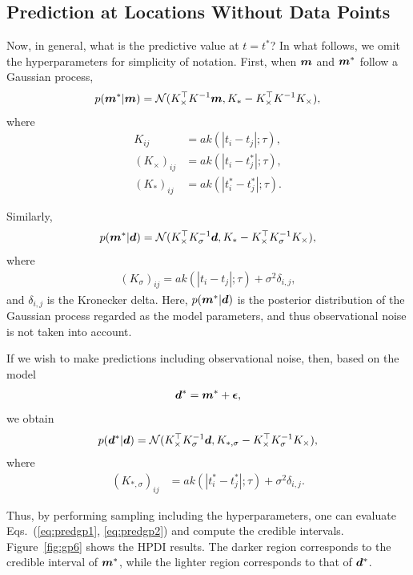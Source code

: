 \subsection*{Prediction at Locations Without Data Points}

Now, in general, what is the predictive value at $t=t^\ast$? In what follows, we omit the hyperparameters for simplicity of notation. First, when $\boldsymbol{m}$ and $\boldsymbol{m}^\ast$ follow a Gaussian process,
\begin{align}
p(\boldsymbol{m}^\ast|\boldsymbol{m}) = \mathcal{N} (K_{\times}^\top K^{-1}  \boldsymbol{m}, K_\ast - K_\times^\top K^{-1} K_\times),
\end{align}
where
\begin{align}
K_{ij} &= a k(|t_i-t_j|;\tau), \\
(K_{\times})_{ij} &= a k(|t_i-t^\ast_j|;\tau), \\
(K_{\ast})_{ij} &= a k(|t^\ast_i-t^\ast_j|;\tau).
\end{align}

Similarly,
\begin{align}
\label{eq:predgp1}
p(\boldsymbol{m}^\ast|\boldsymbol{d}) =  \mathcal{N} (K_{\times}^\top K_\sigma^{-1}  \boldsymbol{d}, K_{\ast} - K_\times^\top K_\sigma^{-1} K_\times),
\end{align}
where
\begin{align}
(K_{\sigma})_{ij} = a k(|t_i-t_j|;\tau) + \sigma^2 \delta_{i,j},
\end{align}
and $\delta_{i,j}$ is the Kronecker delta. Here, $p(\boldsymbol{m}^\ast|\boldsymbol{d})$ is the posterior distribution of the Gaussian process regarded as the model parameters, and thus observational noise is not taken into account.

If we wish to make predictions including observational noise, then, based on the model
\begin{align}
\boldsymbol{d}^\ast = \boldsymbol{m}^\ast + \boldsymbol{\epsilon},
\end{align}
we obtain
\begin{align}
\label{eq:predgp2}
p(\boldsymbol{d}^\ast|\boldsymbol{d}) =  \mathcal{N} (K_{\times}^\top K_\sigma^{-1} \boldsymbol{d}, K_{\ast,\sigma} - K_\times^\top K_\sigma^{-1} K_\times),
\end{align}
where
\begin{align}
(K_{\ast,\sigma})_{ij} &= a k(|t^\ast_i-t^\ast_j|;\tau) + \sigma^2 \delta_{i,j}.
\end{align}

Thus, by performing sampling including the hyperparameters, one can evaluate Eqs.~(\ref{eq:predgp1}, \ref{eq:predgp2}) and compute the credible intervals. Figure~\ref{fig:gp6} shows the HPDI results. The darker region corresponds to the credible interval of $\boldsymbol{m}^\ast$, while the lighter region corresponds to that of $\boldsymbol{d}^\ast$.

